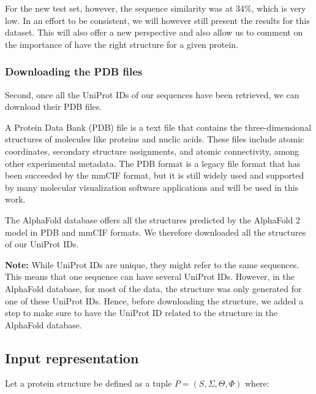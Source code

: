 For the new test set, however, the sequence similarity was at 34\%, which is very low. In an effort to be consistent, we will however still present the results for this dataset. This will also offer a new perspective and also allow us to comment on the importance of have the right structure for a given protein. 

\subsubsection{Downloading the PDB files}

Second, once all the UniProt IDs of our sequences have been retrieved, we can download their PDB files.

A Protein Data Bank (PDB) file is a text file that contains the three-dimensional structures of molecules like
proteins and nuclic acids. \cite{Berman2000ProteinDataBank} These files include atomic coordinates, secondary structure assignments, 
and atomic connectivity, among other experimental metadata. The PDB format is a legacy file format that 
has been succeeded by the mmCIF format, but it is still widely used and supported by many molecular 
visualization software applications and will be used in this work.

The AlphaFold database offers all the structures predicted by the AlphaFold 2 model in PDB and mmCIF formats. 
We therefore downloaded all the structures of our UniProt IDs. 

\textbf{Note:} While UniProt IDs are unique, they might refer to the same sequences. This means that one sequence can have
several UniProt IDs. However, in the AlphaFold database, for most of the data, the structure was only generated 
for one of these UniProt IDs. Hence, before downloading the structure, we added a step to make sure to have 
the UniProt ID related to the structure in the AlphaFold database.

\subsection{Input representation}

Let a protein structure be defined as a tuple $P = (S, \Sigma, \Theta, \Phi)$ where:


